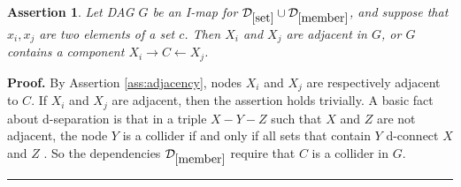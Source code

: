 \documentclass{elsarticle}%
\newtheorem{assertion}[theorem]{Assertion}
\renewenvironment{proof}[1][Proof]{\noindent\textbf{#1.} }{\ \rule{0.5em}{0.5em}}
\newcommand{\X}{X}
\newcommand{\Y}{Y}
\newcommand{\Z}{Z}
\newcommand{\C}{C}
\newcommand{\D}{\mathcal{D}}
\begin{document}
\begin{assertion}
Let DAG $G$ be an I-map for $\D_{\ref{set}}\cup \D_{\ref{member}}$, and suppose that $x_{i},x_{j}$ are two elements of a set $c$. Then $X_{i}$ and $X_{j}$ are adjacent in $G$, or $G$ contains a component $X_{i}\rightarrow C \leftarrow X_j$. \label{ass:set-adjacency}
\end{assertion}
\begin{proof} By Assertion \ref{ass:adjacency}, nodes $\X_{i}$ and $\X_{j}$ are respectively adjacent to $\C$. If $\X_{i}$ and $\X_{j}$ are adjacent, then the assertion holds trivially. 
A basic fact about d-separation is that in a triple $\X-\Y-\Z$ such that $\X$ and $\Z$ are not adjacent, the node $\Y$ is a collider if and only if all sets that contain $\Y$ d-connect $\X$ and $\Z$ \cite[Lemma 2.5]{neapolitan04:_learn_bayes_networ}. So the dependencies $\D_{\ref{member}}$ require that $\C$ is a collider in $G$.
\end{proof}



\end{document}
